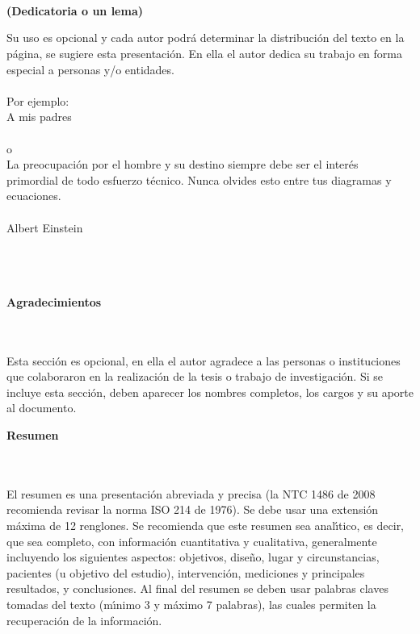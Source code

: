 \newpage
\thispagestyle{empty} \textbf{}\normalsize
\\\\\\%
\textbf{(Dedicatoria o un lema)}\\[4.0cm]

\begin{flushright}
\begin{minipage}{8cm}
    \noindent
        \small
        Su uso es opcional y cada autor podr\'{a} determinar la distribuci\'{o}n del texto en la p\'{a}gina, se sugiere esta presentaci\'{o}n. En ella el autor dedica su trabajo en forma especial a personas y/o entidades.\\[1.0cm]\\
        Por ejemplo:\\[1.0cm]
        A mis padres\\[1.0cm]\\
        o\\[1.0cm]
        La preocupaci\'{o}n por el hombre y su destino siempre debe ser el
        inter\'{e}s primordial de todo esfuerzo t\'{e}cnico. Nunca olvides esto
        entre tus diagramas y ecuaciones.\\\\
        Albert Einstein\\
\end{minipage}
\end{flushright}

\newpage{\pagestyle{empty}\cleardoublepage}

\newpage
\thispagestyle{empty} \textbf{}\normalsize
\\\\\\%
\textbf{\LARGE Agradecimientos}
\\\\
Esta secci\'{o}n es opcional, en ella el autor agradece a las personas o instituciones que colaboraron en la realizaci\'{o}n de la tesis  o trabajo de investigaci\'{o}n. Si se incluye esta secci\'{o}n, deben aparecer los nombres completos, los cargos y su aporte al documento.\\

\newpage{\pagestyle{empty}\cleardoublepage}

\newpage
\textbf{\LARGE Resumen}
\\\\
El resumen es una presentaci\'{o}n abreviada y precisa (la NTC 1486 de 2008 recomienda revisar la norma ISO 214 de 1976). Se debe usar una extensi\'{o}n m\'{a}xima de 12 renglones. Se recomienda que este resumen sea anal\'{\i}tico, es decir, que sea completo, con informaci\'{o}n cuantitativa y cualitativa, generalmente incluyendo los siguientes aspectos: objetivos, dise\~{n}o, lugar y circunstancias, pacientes (u objetivo del estudio), intervenci\'{o}n, mediciones y principales resultados, y conclusiones. Al final del resumen se deben usar palabras claves tomadas del texto (m\'{\i}nimo 3 y m\'{a}ximo 7 palabras), las cuales permiten la recuperaci\'{o}n de la informaci\'{o}n.\\

